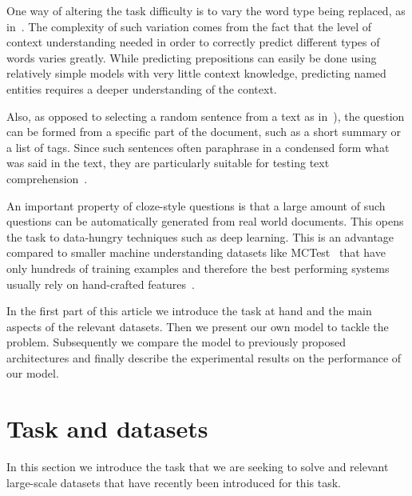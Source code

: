 \documentclass[11pt]{article}
\begin{document}
One way of altering the task difficulty is to vary the word type being replaced, as in~\cite{hill2015goldilocks}.
The complexity of such variation comes from the fact that the level of context understanding needed in order to correctly predict different types of words varies greatly.
While predicting prepositions can easily be done using relatively simple models with very little context knowledge, predicting named entities requires a deeper understanding of the context.

Also, as opposed to selecting a random sentence from a text as in~\cite{hill2015goldilocks}), the question can be formed from a specific part of the document, such as a short summary or a list of tags. Since such sentences often paraphrase in a condensed form what was said in the text, they are particularly suitable for testing text comprehension~\cite{hermann2015teaching}.




An important property of cloze-style questions is that a large amount of such questions can be automatically generated from real world documents. This opens the task to data-hungry techniques such as deep learning. 
This is an advantage compared to smaller machine understanding datasets like MCTest~\cite{Richardson2013} that have only hundreds of training examples and therefore the best performing systems usually rely on hand-crafted features~\cite{Sachan2015,Narasimhan2015a}.

In the first part of this article we introduce the task at hand and the main aspects of the relevant datasets. 
Then we present our own model to tackle the problem. Subsequently we compare the model to previously proposed architectures and finally describe the experimental results on the performance of our model.





\section{Task and datasets}

In this section we introduce the task that we are seeking to solve and relevant large-scale datasets that have recently been introduced for this task. 
\end{document}

